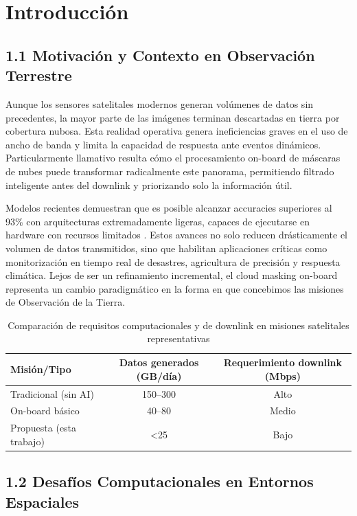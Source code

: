 \section{Introducción}

\subsection{1.1 Motivación y Contexto en Observación Terrestre}

Aunque los sensores satelitales modernos generan volúmenes de datos sin precedentes, la mayor parte de las imágenes terminan descartadas en tierra por cobertura nubosa. Esta realidad operativa genera ineficiencias graves en el uso de ancho de banda y limita la capacidad de respuesta ante eventos dinámicos. Particularmente llamativo resulta cómo el procesamiento on-board de máscaras de nubes puede transformar radicalmente este panorama, permitiendo filtrado inteligente antes del downlink y priorizando solo la información útil.

Modelos recientes demuestran que es posible alcanzar accuracies superiores al 93\% con arquitecturas extremadamente ligeras, capaces de ejecutarse en hardware con recursos limitados \cite{Ali2026_Lightweight}. Estos avances no solo reducen drásticamente el volumen de datos transmitidos, sino que habilitan aplicaciones críticas como monitorización en tiempo real de desastres, agricultura de precisión y respuesta climática. Lejos de ser un refinamiento incremental, el cloud masking on-board representa un cambio paradigmático en la forma en que concebimos las misiones de Observación de la Tierra.

\begin{table}[h]
\centering
\caption{Comparación de requisitos computacionales y de downlink en misiones satelitales representativas}
\label{tab:requirements}
\begin{tabular}{lcc}
\toprule
Misión/Tipo & Datos generados (GB/día) & Requerimiento downlink (Mbps) \\
\midrule
Tradicional (sin AI) & 150--300 & Alto \\
On-board básico & 40--80 & Medio \\
Propuesta (esta trabajo) & <25 & Bajo \\
\bottomrule
\end{tabular}
\end{table}

\subsection{1.2 Desafíos Computacionales en Entornos Espaciales}


